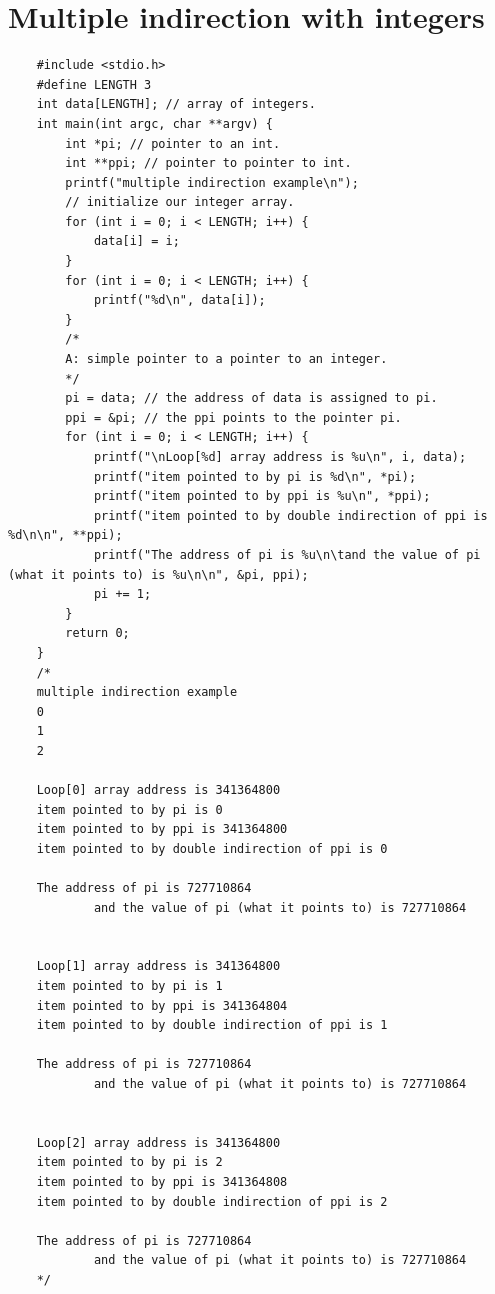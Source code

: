 \section{Multiple indirection with integers}
\begin{verbatim}
    #include <stdio.h>
    #define LENGTH 3
    int data[LENGTH]; // array of integers.
    int main(int argc, char **argv) {
        int *pi; // pointer to an int.
        int **ppi; // pointer to pointer to int.
        printf("multiple indirection example\n");
        // initialize our integer array.
        for (int i = 0; i < LENGTH; i++) {
            data[i] = i;
        }
        for (int i = 0; i < LENGTH; i++) {
            printf("%d\n", data[i]);
        }
        /*
        A: simple pointer to a pointer to an integer.
        */
        pi = data; // the address of data is assigned to pi.
        ppi = &pi; // the ppi points to the pointer pi.
        for (int i = 0; i < LENGTH; i++) {
            printf("\nLoop[%d] array address is %u\n", i, data);
            printf("item pointed to by pi is %d\n", *pi);
            printf("item pointed to by ppi is %u\n", *ppi);
            printf("item pointed to by double indirection of ppi is %d\n\n", **ppi);
            printf("The address of pi is %u\n\tand the value of pi (what it points to) is %u\n\n", &pi, ppi);
            pi += 1;
        }
        return 0;
    }
    /*
    multiple indirection example
    0
    1
    2

    Loop[0] array address is 341364800
    item pointed to by pi is 0
    item pointed to by ppi is 341364800
    item pointed to by double indirection of ppi is 0

    The address of pi is 727710864
            and the value of pi (what it points to) is 727710864


    Loop[1] array address is 341364800
    item pointed to by pi is 1
    item pointed to by ppi is 341364804
    item pointed to by double indirection of ppi is 1

    The address of pi is 727710864
            and the value of pi (what it points to) is 727710864


    Loop[2] array address is 341364800
    item pointed to by pi is 2
    item pointed to by ppi is 341364808
    item pointed to by double indirection of ppi is 2

    The address of pi is 727710864
            and the value of pi (what it points to) is 727710864
    */
\end{verbatim}
